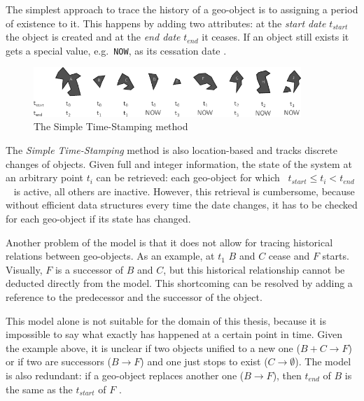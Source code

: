 The simplest approach to trace the history of a geo-object is to assigning a period of existence to it. This happens by adding two attributes: at the \emph{start date} $t_{start}$ the object is created and at the \emph{end date} $t_{end}$ it ceases. If an object still exists it gets a special value, e.g.\ \texttt{NOW}, as its cessation date
\cite{hunter90timestamping}.

\begin{figure}[H]
  \vspace{1em}
  \centering
  \includegraphics[width=0.9\textwidth]{graphics/basics/stdm/simple_time_stamping}
  \caption{The Simple Time-Stamping method \cite{hunter90timestamping}}
  \label{fig:simple_time_stamping}
\end{figure}

The \emph{Simple Time-Stamping} method is also location-based and tracks discrete changes of objects. Given full and integer information, the state of the system at an arbitrary point $t_i$ can be retrieved: each geo-object for which ~$t_{start} \leq t_i < t_{end}$~ is active, all others are inactive. However, this retrieval is cumbersome, because without efficient data structures every time the date changes, it has to be checked for each geo-object if its state has changed.

Another problem of the model is that it does not allow for tracing historical relations between geo-objects. As an example, at $t_1$ $B$ and $C$ cease and $F$ starts. Visually, $F$ is a successor of $B$ and $C$, but this historical relationship cannot be deducted directly from the model. This shortcoming can be resolved by adding a reference to the predecessor and the successor of the object.

This model alone is not suitable for the domain of this thesis, because it is impossible to say what exactly has happened at a certain point in time. Given the example above, it is unclear if two objects unified to a new one ($B+C \to F$) or if two are successors ($B \to F$) and one just stops to exist ($C \to \emptyset$). The model is also redundant: if a geo-object replaces another one ($B \to F$), then $t_{end}$ of $B$ is the same as the $t_{start}$ of $F$
\cite[p. 46-47]{solana2014spatio}.


